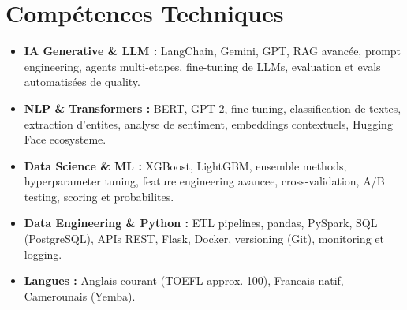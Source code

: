 \documentclass[a4paper,11pt]{article}
\begin{document}
\section{Comp\'etences Techniques}
\begin{itemize}[leftmargin=*, nosep]
    \item \small{\textbf{IA Generative \& LLM :} LangChain, Gemini, GPT, RAG avanc\'ee, prompt engineering, agents multi-etapes, fine-tuning de LLMs, evaluation et evals automatis\'ees de quality.}
    \item \small{\textbf{NLP \& Transformers :} BERT, GPT-2, fine-tuning, classification de textes, extraction d'entites, analyse de sentiment, embeddings contextuels, Hugging Face ecosysteme.}
    \item \small{\textbf{Data Science \& ML :} XGBoost, LightGBM, ensemble methods, hyperparameter tuning, feature engineering avancee, cross-validation, A/B testing, scoring et probabilites.}
    \item \small{\textbf{Data Engineering \& Python :} ETL pipelines, pandas, PySpark, SQL (PostgreSQL), APIs REST, Flask, Docker, versioning (Git), monitoring et logging.}
    \item \small{\textbf{Langues :} Anglais courant (TOEFL approx. 100), Francais natif, Camerounais (Yemba).}
\end{itemize}
\end{document}
